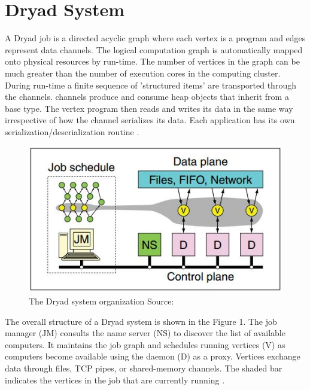 \documentclass[9pt,twocolumn,twoside]{../../styles/osajnl}
\begin{document}
\section{Dryad System}
A Dryad job is a directed acyclic graph where each vertex is a program
and edges represent data channels. The logical computation graph is
automatically mapped onto physical resources by run-time. The number
of vertices in the graph can be much greater than the number of
execution cores in the computing cluster. During run-time a finite
sequence of 'structured items' are transported through the
channels. channels produce and consume heap objects that inherit from
a base type. The vertex program then reads and writes its data in the
same way irrespective of how the channel serializes its data. Each
application has its own serialization/deserialization routine
\cite{DryadMSR2}.
\begin{figure}[htbp]
\begin{center}
\centering
\includegraphics[width=\linewidth]{images/img1}
\caption{The Dryad system organization Source:\cite{DryadMSR2}}
\label{fig:false-color}
\end{center}
\end{figure}


The overall structure of a Dryad system is shown in the Figure 1. The
job manager (JM) consults the name server (NS) to discover the list of
available computers. It maintains the job graph and schedules running
vertices (V) as computers become available using the daemon (D) as a
proxy. Vertices exchange data through files, TCP pipes, or
shared-memory channels. The shaded bar indicates the vertices in the
job that are currently running \cite{DryadMSR2}.
\end{document}

